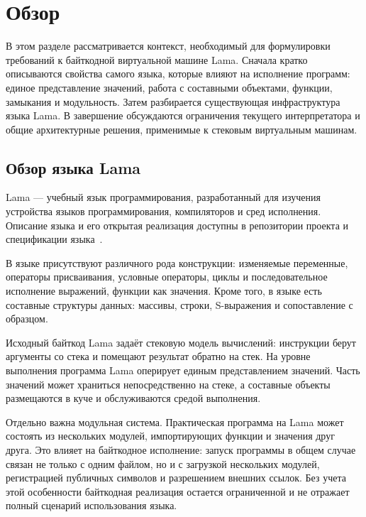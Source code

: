 
\section{Обзор}
\label{sec:relatedworks}

В этом разделе рассматривается контекст, необходимый для формулировки
требований к байткодной виртуальной машине Lama. Сначала кратко описываются
свойства самого языка, которые влияют на исполнение программ: единое
представление значений, работа с составными объектами, функции, замыкания и
модульность. Затем разбирается существующая инфраструктура языка Lama. В завершение обсуждаются ограничения
текущего интерпретатора и общие архитектурные решения, применимые к стековым
виртуальным машинам.

\subsection{Обзор языка Lama}

Lama --- учебный язык программирования, разработанный для изучения устройства языков
программирования, компиляторов и сред исполнения. Описание языка и его открытая реализация доступны
в репозитории проекта и спецификации языка~\cite{LamaReadme,LamaSpec}. 

В языке присутствуют различного рода конструкции: изменяемые переменные, операторы присваивания,
условные операторы, циклы и последовательное исполнение выражений, функции как значения. Кроме того,
в языке есть составные структуры данных: массивы, строки, S-выражения и сопоставление с образцом. 

Исходный байткод Lama задаёт стековую модель вычислений: инструкции берут аргументы со стека и
помещают результат обратно на стек. На уровне выполнения программа Lama оперирует единым
представлением значений. Часть значений может храниться непосредственно на стеке, а составные
объекты размещаются в куче и обслуживаются средой выполнения.

Отдельно важна модульная система. Практическая программа на Lama может состоять из нескольких
модулей, импортирующих функции и значения друг друга. Это влияет на байткодное исполнение: запуск
программы в общем случае связан не только с одним файлом, но и с загрузкой нескольких модулей,
регистрацией публичных символов и разрешением внешних ссылок. Без учета этой особенности байткодная
реализация остается ограниченной и не отражает полный сценарий использования языка.

